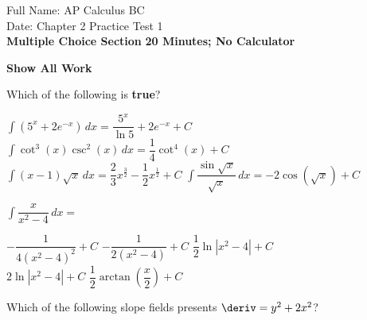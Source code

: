 \pagecolor{gray!10}%
Full Name: \hfill AP Calculus BC \\[22pt]
Date: \hfill Chapter 2 Practice Test 1 \\[22pt]
\textbf{Multiple Choice Section} \hfill \textbf{20 Minutes; No Calculator} \\[11pt]

\begin{center}
    \textbf{Show All Work}
\end{center} \vspace{11pt}

\begin{questions}
    \question Which of the following is \textbf{true}? \\

    \begin{oneparchoices}
        \choice $\int \left(5^x + 2e^{-x}\right) \, dx = \dfrac{5^x}{\ln 5} + 2e^{-x} + C$
        \choice $\int \cot^3 (x)\csc^2 (x) \, dx = \dfrac{1}{4}\cot^4 (x) + C$ \\[11pt]
        \makebox[0.035\textwidth] \choice $\int (x - 1)\sqrt{x} \, dx = \dfrac{2}{3}x^{\frac{3}{2}} - \dfrac{1}{2}x^{\frac{1}{2}} + C$
        \makebox[0.15\textwidth] \choice $\int \dfrac{\sin \sqrt{x}}{\sqrt{x}} \, dx = -2\cos \left(\sqrt{x}\right) + C$
    \end{oneparchoices} \par \horizontalline

    \question $\int \dfrac{x}{x^2 - 4} \, dx = $ \\
    
    \begin{oneparchoices}
        \choice $-\dfrac{1}{4\left(x^2 - 4\right)^2} + C$
        \choice $-\dfrac{1}{2\left(x^2 - 4\right)} + C$
        \choice $\dfrac{1}{2}\ln |x^2 - 4| + C$ \\[11pt]
        \makebox[0.21\textwidth] \choice $2\ln |x^2 - 4| + C$ 
        \makebox[0.23\textwidth] \choice $\dfrac{1}{2}\arctan \left(\dfrac{x}{2}\right) + C$
    \end{oneparchoices} \par \horizontalline

    \newpage

    \question Which of the following slope fields presents $\deriv = y^2 + 2x^2$? \\


\end{questions}
